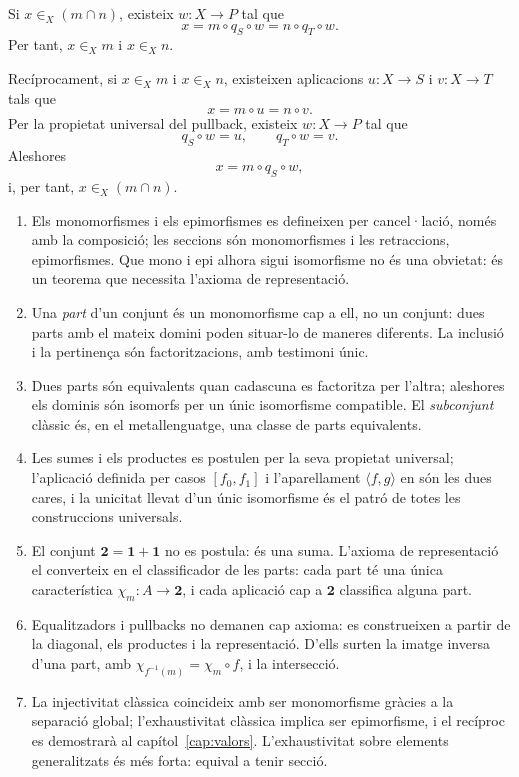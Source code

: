 \begin{prova}
Si \(x\in_X(m\cap n)\), existeix \(w:X\to P\) tal que
\[
x=m\circ q_S\circ w=n\circ q_T\circ w.
\]
Per tant, \(x\in_Xm\) i \(x\in_Xn\).

Recíprocament, si \(x\in_Xm\) i \(x\in_Xn\), existeixen aplicacions \(u:X\to S\) i \(v:X\to T\) tals que
\[
x=m\circ u=n\circ v.
\]
Per la propietat universal del pullback, existeix \(w:X\to P\) tal que
\[
q_S\circ w=u,
\qquad
q_T\circ w=v.
\]
Aleshores
\[
x=m\circ q_S\circ w,
\]
i, per tant, \(x\in_X(m\cap n)\).
\end{prova}

\begin{resumcap}
\begin{enumerate}
  \item Els monomorfismes i els epimorfismes es defineixen per cancel·lació, només amb la composició; les seccions són monomorfismes i les retraccions, epimorfismes. Que mono i epi alhora sigui isomorfisme no és una obvietat: és un teorema que necessita l'axioma de representació.
  \item Una \emph{part} d'un conjunt és un monomorfisme cap a ell, no un conjunt: dues parts amb el mateix domini poden situar-lo de maneres diferents. La inclusió i la pertinença són factoritzacions, amb testimoni únic.
  \item Dues parts són equivalents quan cadascuna es factoritza per l'altra; aleshores els dominis són isomorfs per un únic isomorfisme compatible. El \emph{subconjunt} clàssic és, en el metallenguatge, una classe de parts equivalents.
  \item Les sumes i els productes es postulen per la seva propietat universal; l'aplicació definida per casos \([f_0,f_1]\) i l'aparellament \(\langle f,g\rangle\) en són les dues cares, i la unicitat llevat d'un únic isomorfisme és el patró de totes les construccions universals.
  \item El conjunt \(\mathbf2=\mathbf1+\mathbf1\) no es postula: és una suma. L'axioma de representació el converteix en el classificador de les parts: cada part té una única característica \(\chi_m\colon A\to\mathbf2\), i cada aplicació cap a \(\mathbf2\) classifica alguna part.
  \item Equalitzadors i pullbacks no demanen cap axioma: es construeixen a partir de la diagonal, els productes i la representació. D'ells surten la imatge inversa d'una part, amb \(\chi_{f^{-1}(m)}=\chi_m\circ f\), i la intersecció.
  \item La injectivitat clàssica coincideix amb ser monomorfisme gràcies a la separació global; l'exhaustivitat clàssica implica ser epimorfisme, i el recíproc es demostrarà al capítol~\ref{cap:valors}. L'exhaustivitat sobre elements generalitzats és més forta: equival a tenir secció.

\end{enumerate}
\end{resumcap}
